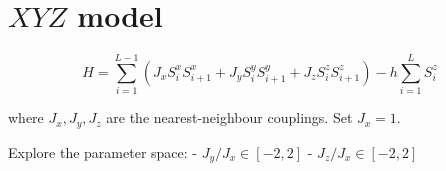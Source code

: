 \documentclass{article}
\begin{document}
\section*{$XYZ$ model}

\begin{equation}
H = \sum_{i=1}^{L-1} \left( J_x S_i^x S_{i+1}^x + J_y S_i^y S_{i+1}^y + J_z S_i^z S_{i+1}^z \right) - h \sum_{i=1}^{L} S_i^z
\end{equation}

where $J_x, J_y, J_z$ are the nearest-neighbour couplings.
Set $J_x = 1$.

Explore the parameter space:
- $J_y/J_x \in [-2, 2]$
- $J_z/J_x \in [-2, 2]$
\end{document}
